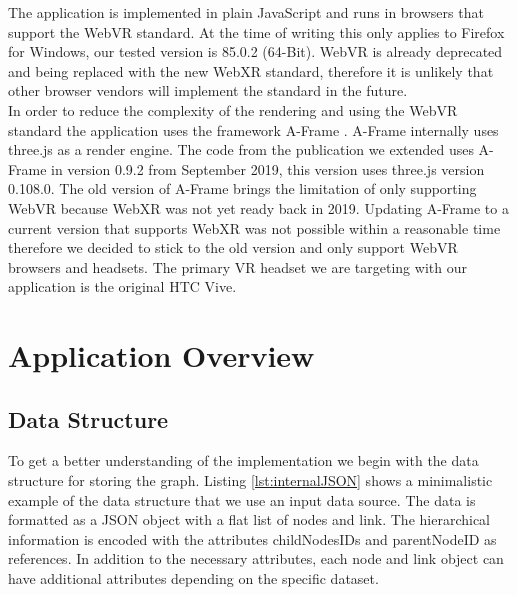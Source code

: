 The application is implemented in plain JavaScript and runs in browsers that support the WebVR standard. 
At the time of writing this only applies to Firefox for Windows, our tested version is 85.0.2 (64-Bit). 
WebVR is already deprecated and being replaced with the new WebXR standard, therefore it is unlikely that other browser vendors will implement the standard in the future.\\
In order to reduce the complexity of the rendering and using the WebVR standard the application uses the framework A-Frame \cite{aframe}. A-Frame internally uses three.js \cite{threejs} as a render engine. The code from the publication we extended uses A-Frame in version 0.9.2 from September 2019, this version uses three.js version 0.108.0. 
The old version of A-Frame brings the limitation of only supporting WebVR because WebXR was not yet ready back in 2019. 
Updating A-Frame to a current version that supports WebXR was not possible within a reasonable time therefore we decided to stick to the old version and only support WebVR browsers and headsets.
The primary VR headset we are targeting with our application is the original HTC Vive.

\section{Application Overview}




\label{sec:applOverview}
\subsection{Data Structure}
\label{subSec:dataStruct}
To get a better understanding of the implementation we begin with the data structure for storing the graph.
Listing \ref{lst:internalJSON} shows a minimalistic example of the data structure that we use an input data source. The data is formatted as a JSON object with a flat list of nodes and link. The hierarchical information is encoded with the attributes childNodesIDs and parentNodeID as references. 
In addition to the necessary attributes, each node and link object can have additional attributes depending on the specific dataset.


